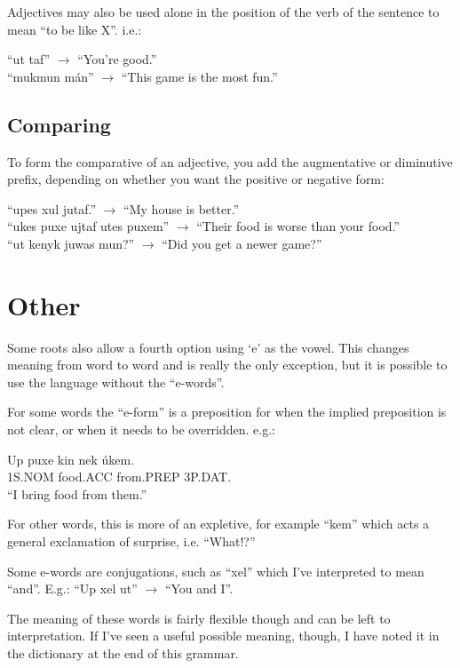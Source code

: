 \documentclass{book}
\begin{document}
Adjectives may also be used alone in the position of the verb of the sentence to mean ``to be like X''. i.e.:

\begin{center}
    ``ut taf'' $\rightarrow$ ``You're good.'' \\
    ``mukmun mán'' $\rightarrow$ ``This game is the most fun.''
\end{center}

\subsection{Comparing}
To form the comparative of an adjective, you add the augmentative or diminutive prefix, depending
on whether you want the positive or negative form:

\begin{center}
    ``upes xul jutaf.'' $\rightarrow$ ``My house is better.'' \\
    ``ukes puxe ujtaf utes puxem'' $\rightarrow$ ``Their food is worse than your food.'' \\
    ``ut kenyk juwas mun?'' $\rightarrow$ ``Did you get a newer game?''
\end{center}


\section{Other}
Some roots also allow a fourth option using `e' as the vowel. This changes meaning from word to word
and is really the only exception, but it is possible to use the language without the ``e-words''.

For some words the ``e-form'' is a preposition for when the implied preposition is not clear, or when
it needs to be overridden. e.g.:

\begin{exe}
    \ex
    \gll Up puxe kin nek úkem.\\
    1S.NOM food.ACC from.PREP 3P.DAT. \\
    \glt ``I bring food from them.''
\end{exe}

For other words, this is more of an expletive, for example ``kem'' which acts a general exclamation
of surprise, i.e. ``What!?''

Some e-words are conjugations, such as ``xel'' which I've interpreted to mean ``and''.
E.g.: ``Up xel ut'' $\rightarrow$ ``You and I''.

The meaning of these words is fairly flexible though and can be left to interpretation. If I've seen
a useful possible meaning, though, I have noted it in the dictionary at the end of this grammar.
\end{document}
